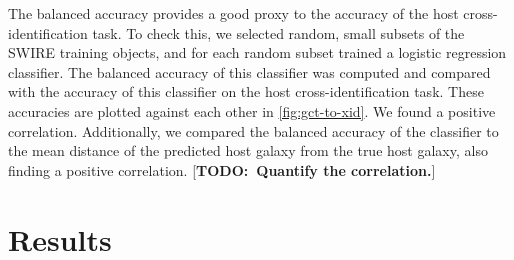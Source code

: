 \documentclass[fleqn,usenatbib,usedcolumn]{mnras}
\newcommand{\todo}[1]{ {\color{red}[{\bf TODO:~{#1}}]} }
\begin{document}
    The balanced accuracy provides a good proxy to the accuracy of the host
    cross-identification task. To check this, we selected random, small
    subsets of the SWIRE training objects, and for each random subset trained
    a logistic regression classifier. The balanced accuracy of this classifier
    was computed and compared with the accuracy of this classifier on the host
    cross-identification task. These accuracies are plotted against each other
    in \autoref{fig:gct-to-xid}. We found a positive correlation.
    Additionally, we compared the balanced accuracy of the classifier to the
    mean distance of the predicted host galaxy from the true host galaxy, also
    finding a positive correlation. \todo{Quantify the correlation.}

\section{Results}\label{results}
\end{document}
